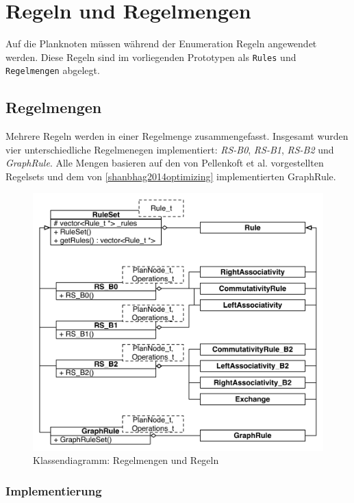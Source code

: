 \section{Regeln und Regelmengen}
Auf die Planknoten müssen während der Enumeration Regeln angewendet werden. Diese Regeln sind im vorliegenden Prototypen als \texttt{Rules} und \texttt{Regelmengen} abgelegt.

\subsection{Regelmengen}
Mehrere Regeln werden in einer Regelmenge zusammengefasst.
Insgesamt wurden vier unterschiedliche Regelmenegen implementiert: \textit{RS-B0}, \textit{RS-B1}, \textit{RS-B2} und \textit{GraphRule}.
Alle Mengen basieren auf den von Pellenkoft et al. vorgestellten Regelsets und dem von \ref{shanbhag2014optimizing} implementierten GraphRule.

\begin{figure}[ht]
  \centering
  \includegraphics[width=\textwidth]{04_Implementierung/00_media/RuleSets.pdf}
  \caption{Klassendiagramm: Regelmengen und Regeln}
  \label{RuleSetClass}
\end{figure}

\subsubsection{Implementierung}
\label{sec:RuleImplementation}

